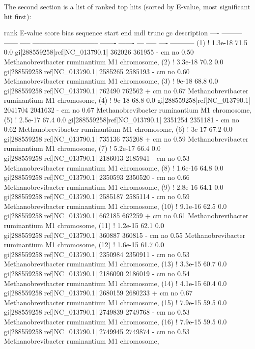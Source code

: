 The second section is a list of ranked top hits (sorted by E-value,
most significant hit first):

\begin{sreoutput}
 rank     E-value  score  bias  sequence                        start     end   mdl trunc   gc  description
 ----   --------- ------ -----  ----------------------------- ------- -------   --- ----- ----  -----------
  (1) !   1.3e-18   71.5   0.0  gi|288559258|ref|NC_013790.1|  362026  361955 -  cm    no 0.50  Methanobrevibacter ruminantium M1 chromosome, 
  (2) !   3.3e-18   70.2   0.0  gi|288559258|ref|NC_013790.1| 2585265 2585193 -  cm    no 0.60  Methanobrevibacter ruminantium M1 chromosome, 
  (3) !     9e-18   68.8   0.0  gi|288559258|ref|NC_013790.1|  762490  762562 +  cm    no 0.67  Methanobrevibacter ruminantium M1 chromosome, 
  (4) !     9e-18   68.8   0.0  gi|288559258|ref|NC_013790.1| 2041704 2041632 -  cm    no 0.67  Methanobrevibacter ruminantium M1 chromosome, 
  (5) !   2.5e-17   67.4   0.0  gi|288559258|ref|NC_013790.1| 2351254 2351181 -  cm    no 0.62  Methanobrevibacter ruminantium M1 chromosome, 
  (6) !     3e-17   67.2   0.0  gi|288559258|ref|NC_013790.1|  735136  735208 +  cm    no 0.59  Methanobrevibacter ruminantium M1 chromosome, 
  (7) !   5.2e-17   66.4   0.0  gi|288559258|ref|NC_013790.1| 2186013 2185941 -  cm    no 0.53  Methanobrevibacter ruminantium M1 chromosome, 
  (8) !   1.6e-16   64.8   0.0  gi|288559258|ref|NC_013790.1| 2350593 2350520 -  cm    no 0.66  Methanobrevibacter ruminantium M1 chromosome, 
  (9) !   2.8e-16   64.1   0.0  gi|288559258|ref|NC_013790.1| 2585187 2585114 -  cm    no 0.59  Methanobrevibacter ruminantium M1 chromosome, 
 (10) !   9.1e-16   62.5   0.0  gi|288559258|ref|NC_013790.1|  662185  662259 +  cm    no 0.61  Methanobrevibacter ruminantium M1 chromosome, 
 (11) !   1.2e-15   62.1   0.0  gi|288559258|ref|NC_013790.1|  360887  360815 -  cm    no 0.55  Methanobrevibacter ruminantium M1 chromosome, 
 (12) !   1.6e-15   61.7   0.0  gi|288559258|ref|NC_013790.1| 2350984 2350911 -  cm    no 0.53  Methanobrevibacter ruminantium M1 chromosome, 
 (13) !   3.3e-15   60.7   0.0  gi|288559258|ref|NC_013790.1| 2186090 2186019 -  cm    no 0.54  Methanobrevibacter ruminantium M1 chromosome, 
 (14) !   4.1e-15   60.4   0.0  gi|288559258|ref|NC_013790.1| 2680159 2680233 +  cm    no 0.67  Methanobrevibacter ruminantium M1 chromosome, 
 (15) !   7.9e-15   59.5   0.0  gi|288559258|ref|NC_013790.1| 2749839 2749768 -  cm    no 0.53  Methanobrevibacter ruminantium M1 chromosome, 
 (16) !   7.9e-15   59.5   0.0  gi|288559258|ref|NC_013790.1| 2749945 2749874 -  cm    no 0.53  Methanobrevibacter ruminantium M1 chromosome, 

\end{sreoutput}
